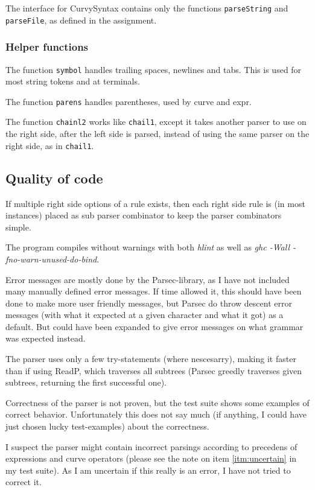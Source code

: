 \documentclass[a4paper, 10pt]{article}
\begin{document}
The interface for CurvySyntax contains only the functions \texttt{parseString} and \texttt{parseFile}, as defined in the assignment.

\subsubsection*{Helper functions}
The function \texttt{symbol} handles trailing spaces, newlines and tabs. This is used for most string tokens and at terminals.

The function \texttt{parens} handles parentheses, used by curve and expr.

The function \texttt{chainl2} works like \texttt{chail1}, except it takes another parser to use on the right side, after the left side is parsed, instead of using the same parser on the right side, as in \texttt{chail1}.

\subsection*{Quality of code}
If multiple right side options of a rule exists, then each right side rule is (in most instances) placed as sub parser combinator to keep the parser combinators simple.

The program compiles without warnings with both \textit{hlint} as well as \textit{ghc -Wall -fno-warn-unused-do-bind}.

Error messages are mostly done by the Parsec-library, as I have not included many manually defined error messages. If time allowed it, this should have been done to make more user friendly messages, but Parsec do throw descent error messages (with what it expected at a given character and what it got) as a default. But could have been expanded to give error messages on what grammar was expected instead.

The parser uses only a few try-statements (where nescesarry), making it faster than if using ReadP, which traverses all subtrees (Parsec greedly traverses given subtrees, returning the first successful one).

Correctness of the parser is not proven, but the test suite shows some examples of correct behavior. Unfortunately this does not say much (if anything, I could have just chosen lucky test-examples) about the correctness.

I suspect the parser might contain incorrect parsings according to precedens of expressions and curve operators (please see the note on item \ref{itm:uncertain} in my test suite). As I am uncertain if this really is an error, I have not tried to correct it.
\end{document}
